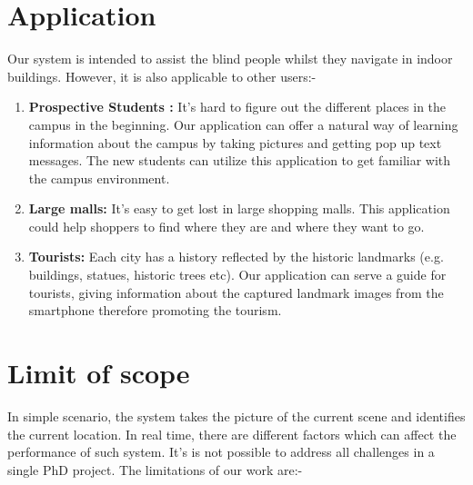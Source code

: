 \section{Application}
\label{sec:applications}

Our system is intended to assist the blind people 
whilst they navigate in indoor buildings. However, 
it is also applicable to other users:-

\begin{enumerate}
\item \textbf{Prospective Students :}
It's hard to figure out the different places 
in the campus in the beginning. Our application 
can offer a natural way of learning information about
the campus by taking pictures and getting pop up 
text messages. The new students can utilize 
this application to get familiar 
with the campus environment. 

\item \textbf{Large malls: } 
It's easy to get lost in 
large shopping malls. This application could help 
shoppers to find where they are and where they want to go.


\item \textbf{Tourists: } 
Each city has a history reflected by the historic landmarks 
(e.g. buildings, statues, historic trees etc).
Our application can serve a guide for tourists, giving 
information about the captured landmark images 
from the smartphone therefore promoting the tourism.

\end{enumerate}


\section{Limit of scope}
\label{sec:limitofscope}
In simple scenario, the system takes the 
picture of the current scene and identifies the 
current location. In real time, there are different 
factors which can affect the performance of 
such system. It's is not possible to address all 
challenges in a single PhD project. The limitations of our work 
are:-

